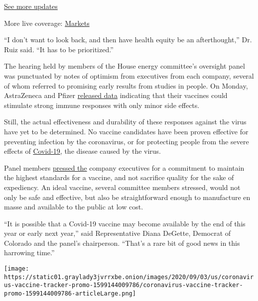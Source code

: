 \href{https://www.nytimes3xbfgragh.onion/2020/09/04/world/covid-19-coronavirus.html?action=click\&pgtype=Article\&state=default\&region=MAIN_CONTENT_1\&context=storylines_live_updates}{See
more updates}

More live coverage:
\href{https://www.nytimes3xbfgragh.onion/live/2020/09/04/business/stock-market-today-coronavirus?action=click\&pgtype=Article\&state=default\&region=MAIN_CONTENT_1\&context=storylines_live_updates}{Markets}

``I don't want to look back, and then have health equity be an
afterthought,'' Dr. Ruiz said. ``It has to be prioritized.''

The hearing held by members of the House energy committee's oversight
panel was punctuated by notes of optimism from executives from each
company, several of whom referred to promising early results from
studies in people. On Monday, AstraZeneca and Pfizer
\href{https://www.nytimes3xbfgragh.onion/2020/07/20/world/covid-coronavirus-vaccine.html}{released
data} indicating that their vaccines could stimulate strong immune
responses with only minor side effects.

Still, the actual effectiveness and durability of these responses
against the virus have yet to be determined. No vaccine candidates have
been proven effective for preventing infection by the coronavirus, or
for protecting people from the severe effects of
\href{https://www.nytimes3xbfgragh.onion/2020/07/23/health/coronavirus-vaccine-allocation.html}{Covid-19},
the disease caused by the virus.

Panel members
\href{https://energycommerce.house.gov/committee-activity/hearings/hearing-on-pathway-to-a-vaccine-efforts-to-develop-a-safe-effective-and}{pressed
the} company executives for a commitment to maintain the highest
standards for a vaccine, and not sacrifice quality for the sake of
expediency. An ideal vaccine, several committee members stressed, would
not only be safe and effective, but also be straightforward enough to
manufacture en masse and available to the public at low cost.

``It is possible that a Covid-19 vaccine may become available by the end
of this year or early next year,'' said Representative Diana DeGette,
Democrat of Colorado and the panel's chairperson. ``That's a rare bit of
good news in this harrowing time.''

\href{https://www.nytimes3xbfgragh.onion/interactive/2020/science/coronavirus-vaccine-tracker.html}{}

\texttt{[image: https://static01.graylady3jvrrxbe.onion/images/2020/09/03/us/coronavirus-vaccine-tracker-promo-1599144009786/coronavirus-vaccine-tracker-promo-1599144009786-articleLarge.png]}

